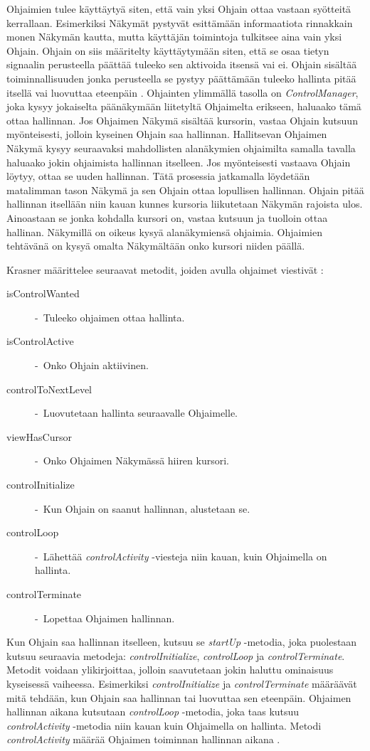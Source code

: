 \documentclass[utf8]{gradu3}
\begin{document}
Ohjaimien tulee käyttäytyä siten, että vain yksi Ohjain ottaa vastaan syötteitä kerrallaan. Esimerkiksi Näkymät pystyvät esittämään informaatiota rinnakkain monen Näkymän kautta, mutta käyttäjän toimintoja tulkitsee aina vain yksi Ohjain. Ohjain on siis määritelty käyttäytymään siten, että se osaa tietyn signaalin perusteella päättää tuleeko sen aktivoida itsensä vai ei. Ohjain sisältää toiminnallisuuden jonka perusteella se pystyy päättämään tuleeko hallinta pitää itsellä vai luovuttaa eteenpäin \parencite[s. 9]{krasner_desc}. Ohjainten ylimmällä tasolla on \textit{ControlManager}, joka kysyy jokaiselta päänäkymään liitetyltä Ohjaimelta erikseen, haluaako tämä ottaa hallinnan. Jos Ohjaimen Näkymä sisältää kursorin, vastaa Ohjain kutsuun myönteisesti, jolloin kyseinen Ohjain saa hallinnan. Hallitsevan Ohjaimen Näkymä kysyy seuraavaksi mahdollisten alanäkymien ohjaimilta samalla tavalla haluaako jokin ohjaimista hallinnan itselleen. Jos myönteisesti vastaava Ohjain löytyy, ottaa se uuden hallinnan. Tätä prosessia jatkamalla löydetään matalimman tason Näkymä ja sen Ohjain ottaa lopullisen hallinnan. Ohjain pitää hallinnan itsellään niin kauan kunnes kursoria liikutetaan Näkymän rajoista ulos. Ainoastaan se jonka kohdalla kursori on, vastaa kutsuun ja tuolloin ottaa hallinan. Näkymillä on oikeus kysyä alanäkymiensä ohjaimia. Ohjaimien tehtävänä on kysyä omalta Näkymältään onko kursori niiden päällä.

Krasner määrittelee seuraavat metodit, joiden avulla ohjaimet viestivät \parencite[s. 9]{krasner_desc}:

\begin{description}
\item[isControlWanted] -\ Tuleeko ohjaimen ottaa hallinta.
\item[isControlActive] -\ Onko Ohjain aktiivinen.
\item[controlToNextLevel] -\ Luovutetaan hallinta seuraavalle Ohjaimelle.
\item[viewHasCursor] -\ Onko Ohjaimen Näkymässä hiiren kursori.
\item[controlInitialize] -\ Kun Ohjain on saanut hallinnan, alustetaan se.
\item[controlLoop] -\ Lähettää \emph{controlActivity} -viesteja niin kauan, kuin Ohjaimella on hallinta.
\item[controlTerminate] -\ Lopettaa Ohjaimen hallinnan.
\end{description} 

Kun Ohjain saa hallinnan itselleen, kutsuu se \emph{startUp} -metodia, joka puolestaan kutsuu seuraavia metodeja: \emph{controlInitialize}, \emph{controlLoop} ja \emph{controlTerminate}. Metodit
voidaan ylikirjoittaa, jolloin saavutetaan jokin haluttu ominaisuus kyseisessä vaiheessa. Esimerkiksi \emph{controlInitialize} ja \emph{controlTerminate} määräävät mitä tehdään, kun Ohjain saa hallinnan tai luovuttaa sen eteenpäin. Ohjaimen hallinnan aikana kutsutaan
\emph{controlLoop} -metodia, joka taas kutsuu \emph{controlActivity} -metodia niin kauan kuin Ohjaimella on hallinta.  Metodi \emph{controlActivity} määrää Ohjaimen toiminnan hallinnan aikana \parencite[s. 9]{krasner_desc}.
\end{document}
